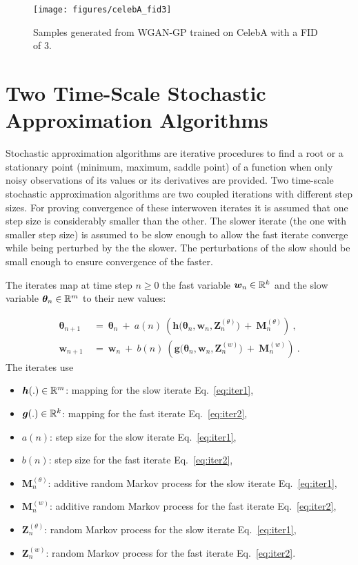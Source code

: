 \documentclass{article}
\newcommand\Bg{\bm{g}}
\newcommand\Bh{\bm{h}}
\newcommand\Bw{\bm{w}}
\newcommand\BM{\bm{M}}
\newcommand\BZ{\bm{Z}}
\newcommand\Bth{\bm{\theta}}
\renewcommand{\geq}{\geqslant}
\begin{document}
\begin{figure}[H]
\texttt{[image: figures/celebA\_fid3]}
\caption[CelebA Samples with FID 3]{Samples generated from WGAN-GP
trained on CelebA with a FID of 3.
  \label{fig:fid4} }
\end{figure}

\section{Two Time-Scale Stochastic Approximation Algorithms}
\label{sec:background}

Stochastic approximation algorithms are iterative procedures to find
a root or a stationary point (minimum, maximum, saddle point) of a
function when only noisy observations of its values or its
derivatives are provided.
Two time-scale stochastic approximation algorithms are two coupled
iterations with different step sizes. For proving convergence of these
interwoven iterates it is assumed that one
step size is considerably smaller than the other.
The slower iterate (the one with smaller step size) is assumed to be
slow enough to allow the fast iterate converge while being perturbed
by the the slower. The perturbations of the slow should be small
enough to ensure convergence of the faster.



The iterates map at time step $n\geq 0$ the fast variable $\Bw_n \in \dR^k$ and the slow
variable $\Bth_n \in \dR^m$ to their new values:

\begin{align}
\label{eq:iter1}
\Bth_{n+1} \ &= \ \Bth_n \ + \ a(n) \ \left(\Bh\big(\Bth_n, \Bw_n,
               \BZ^{(\theta)}_n \big) \ + \ \BM^{(\theta)}_{n}\right) \ ,\\
\label{eq:iter2}
\Bw_{n+1} \ &= \ \Bw_n  \ + \ b(n)\ \left(\Bg\big(\Bth_n, \Bw_n,
              \BZ^{(w)}_n\big) \ + \ \BM^{(w)}_{n}\right) \ .
\end{align}
The iterates use
\begin{itemize}
\item $\Bh(.)\in \dR^m$:
mapping for the slow iterate Eq.~\eqref{eq:iter1},
\item $\Bg(.)\in \dR^k$:
mapping for the fast iterate Eq.~\eqref{eq:iter2},
\item $a(n)$:
step size for the slow iterate Eq.~\eqref{eq:iter1},
\item $b(n)$:
step size for the fast iterate Eq.~\eqref{eq:iter2},
\item $\BM^{(\theta)}_n$:
additive random Markov process for the slow iterate
Eq.~\eqref{eq:iter1},
\item $\BM^{(w)}_n$:
additive random Markov process for the fast iterate
Eq.~\eqref{eq:iter2},
\item $\BZ^{(\theta)}_n$:
random Markov process for the slow iterate
Eq.~\eqref{eq:iter1},
\item $\BZ^{(w)}_n$:
random Markov process for the fast iterate
Eq.~\eqref{eq:iter2}.
\end{itemize}
\end{document}
